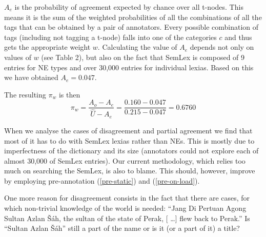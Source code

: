 \documentclass[11pt]{article}
\begin{document}
$A_e$ is the probability of agreement expected by chance over all t-nodes. This means it is the sum of the weighted probabilities of all the combinations of all the tags that can be obtained by a pair of annotators. Every possible combination of tags (including not tagging a t-node) falls into one of the categories $c$ and thus gets the appropriate weight $w$.
%
Calculating the value of $A_e$ depends not only on values of $w$ (see Table 2),
 but also on the fact that SemLex is composed of 9 entries for NE types and over 30,000 entries for individual lexias. Based on this we have obtained $A_e = 0.047$.


The resulting $\pi_w$ is then
\vspace{-5pt} 
$$\pi_w = \frac{A_o - A_e}{\widehat{U} - A_e} = \frac{0.160 - 0.047}{0.215 - 0.047} = 0.6760$$


When we analyse the cases of disagreement and partial agreement we find that most of it has to do with SemLex lexias rather than NEs. This is mostly due to imperfectness of the dictionary and its size (annotators could not explore each of almost 30,000 of SemLex entries). Our current methodology, which relies too much on searching the SemLex, is also to blame. This should, however, improve by employing pre-annotation (\ref{pre-static}) and (\ref{pre-on-load}). 

One more reason for disagreement consists in the fact that there are cases, for which non-trivial knowledge of the world is needed: ``Jang Di Pertuan Agong Sultan Azlan Šáh, the sultan of the state of Perak, [\kern 2pt \ldots] flew back to Perak.'' Is ``Sultan Azlan Šáh'' still a part of the name or is it (or a part of it) a title?
\end{document}
